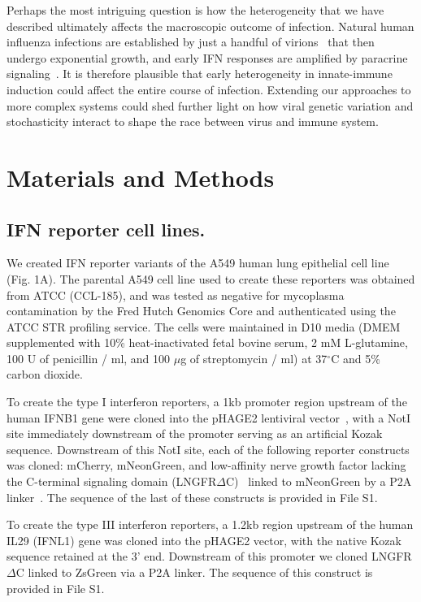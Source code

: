 \documentclass[]{article}
\begin{document}
Perhaps the most intriguing question is how the heterogeneity that we have described ultimately affects the macroscopic outcome of infection.
Natural human influenza infections are established by just a handful of virions~\cite{mccrone2018stochastic, xue2018reconciling, varble2014influenza} that then undergo exponential growth, and early IFN responses are amplified by paracrine signaling~\cite{stetson2006type,honda2006type}.
It is therefore plausible that early heterogeneity in innate-immune induction could affect the entire course of infection.
Extending our approaches to more complex systems could shed further light on how viral genetic variation and stochasticity interact to shape the race between virus and immune system.


\section*{Materials and Methods}
\small
\subsection*{IFN reporter cell lines.}
We created IFN reporter variants of the A549 human lung epithelial cell line (Fig. 1A).
The parental A549 cell line used to create these reporters was obtained from ATCC (CCL-185), and was tested as negative for mycoplasma contamination by the Fred Hutch Genomics Core and authenticated using the ATCC STR profiling service.
The cells were maintained in D10 media (DMEM supplemented with 10\% heat-inactivated fetal bovine serum, 2 mM L-glutamine, 100 U of penicillin / ml, and 100 $\mu$g of streptomycin / ml) at 37$^{\circ}$C and 5\% carbon dioxide.

To create the type I interferon reporters, a 1kb promoter region upstream of the human IFNB1 gene were cloned into the pHAGE2 lentiviral vector~\cite{oconnell2010lentiviral}, with a NotI site immediately downstream of the promoter serving as an artificial Kozak sequence. 
Downstream of this NotI site, each of the following reporter constructs was cloned: mCherry, mNeonGreen, and low-affinity nerve growth factor lacking the C-terminal signaling domain (LNGFR$\Delta$C)~\cite{bonini1997hsv,ruggieri1997cell} linked to mNeonGreen by a P2A linker~\cite{kim2011high}.
The sequence of the last of these constructs is provided in File S1.

To create the type III interferon reporters, a 1.2kb region upstream of the human IL29 (IFNL1) gene was cloned into the pHAGE2 vector, with the native Kozak sequence retained at the 3' end. 
Downstream of this promoter we cloned LNGFR$\Delta$C linked to ZsGreen via a P2A linker.
The sequence of this construct is provided in File S1.
 
\end{document}
